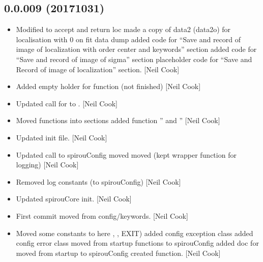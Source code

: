 \documentclass[a4paper,10pt,english]{report}
\begin{document}
\subsection{0.0.009 (2017\sphinxhyphen{}10\sphinxhyphen{}31)}
\label{\detokenize{misc/changelog:id560}}\begin{itemize}
\item {} 
Modified  to accept and
return loc made a copy of data2  (data2o) for localisation with 0 on
fit data dump added code for “Save and record of image of localization
with order center and keywords” section added code for “Save and
record of image of sigma” section placeholder code for “Save and
Record of image of localization” section. {[}Neil Cook{]}

\item {} 
Added empty holder for  function (not
finished) {[}Neil Cook{]}

\item {} 
Updated call for  to . {[}Neil Cook{]}

\item {} 
Moved functions into sections added function ” and
” {[}Neil Cook{]}

\item {} 
Updated init file. {[}Neil Cook{]}

\item {} 
Updated call to spirouConfig moved  moved
 (kept wrapper function for logging) {[}Neil Cook{]}

\item {} 
Removed log constants (to spirouConfig) {[}Neil Cook{]}

\item {} 
Updated spirouCore init. {[}Neil Cook{]}

\item {} 
First commit moved from config/keywords. {[}Neil Cook{]}

\item {} 
Moved some constants to here , , EXIT) added
config exception class added config error class moved
 from startup functions to spirouConfig added doc
for  moved  from startup to spirouConfig
created  function. {[}Neil Cook{]}


\end{itemize}
\end{document}
